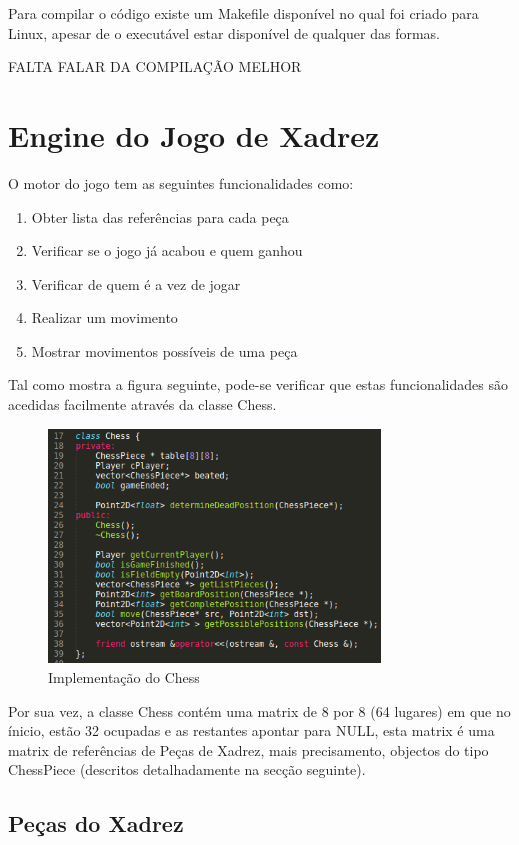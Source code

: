 \documentclass[11pt,a4paper]{report}
\begin{document}
Para compilar o código existe um Makefile disponível no qual foi criado para Linux, apesar de o executável estar disponível de qualquer das formas.

FALTA FALAR DA COMPILAÇÃO MELHOR

\section{Engine do Jogo de Xadrez}

O motor do jogo tem as seguintes funcionalidades como:
\begin{enumerate}
\item{Obter lista das referências para cada peça}
\item{Verificar se o jogo já acabou e quem ganhou}
\item{Verificar de quem é a vez de jogar}
\item{Realizar um movimento}
\item{Mostrar movimentos possíveis de uma peça}
\end{enumerate}

Tal como mostra a figura seguinte, pode-se verificar que estas funcionalidades são acedidas facilmente através da classe Chess.

\begin{figure}[H]
\centerline{\includegraphics[width=250pt]{images/chess.png}}
\caption{Implementação do Chess}
\label{img:complete}
\end{figure}

Por sua vez, a classe Chess contém uma matrix de 8 por 8 (64 lugares) em que no ínicio, estão 32 ocupadas e as restantes apontar para NULL, esta matrix é uma matrix de referências de Peças de Xadrez, mais precisamento, objectos do tipo ChessPiece (descritos detalhadamente na secção seguinte).

\subsection{Peças do Xadrez}
\end{document}
